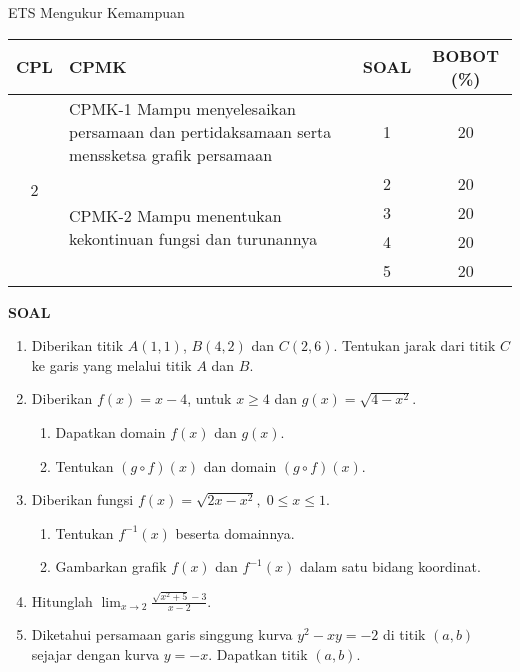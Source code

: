 \documentclass[11pt,openany,a4paper]{article}
\begin{document}
\begin{table}[h]
    \centering
    ETS Mengukur Kemampuan
    \begin{tabular}{|c|m{11cm}|c|c|}
        \hline
        CPL & CPMK                                                                                      & SOAL & BOBOT (\%) \\ \hline
        \multirow{5}{*}{2}
            & CPMK-1 Mampu menyelesaikan persamaan dan pertidaksamaan serta menssketsa grafik persamaan & 1    & 20         \\ \cline{2-4}
            & \multirow{4}{*}{CPMK-2 Mampu menentukan kekontinuan fungsi dan turunannya}                & 2    & 20         \\\cline{3-4}
            &                                                                                           & 3    & 20         \\ \cline{3-4}
            &                                                                                           & 4    & 20         \\ \cline{3-4}
            &                                                                                           & 5    & 20         \\ \hline
    \end{tabular}
\end{table}
{\centering\textbf{SOAL}}
\begin{enumerate}
    \item Diberikan titik $A(1,1)$, $B(4,2)$ dan $C(2,6)$. Tentukan jarak dari titik $C$ ke garis yang melalui titik $A$ dan $B$.

    \item Diberikan $f(x) = x - 4$, untuk $x \geq 4$ dan $g(x) = \sqrt{4 - x^2}$.
          \begin{enumerate}
              \item Dapatkan domain $f(x)$ dan $g(x)$.
              \item Tentukan $(g \circ f)(x)$ dan domain $(g \circ f)(x)$.
          \end{enumerate}

    \item Diberikan fungsi $f(x) = \sqrt{2x - x^2}, \; 0 \leq x \leq 1$.
          \begin{enumerate}
              \item Tentukan $f^{-1}(x)$ beserta domainnya.
              \item Gambarkan grafik $f(x)$ dan $f^{-1}(x)$ dalam satu bidang koordinat.
          \end{enumerate}

    \item Hitunglah
          $\displaystyle
              \lim_{x \to 2} \frac{\sqrt{x^2 + 5} - 3}{x - 2}.
          $

    \item Diketahui persamaan garis singgung kurva $y^2 - xy = -2$ di titik $(a,b)$ sejajar dengan kurva $y = -x$.
          Dapatkan titik $(a,b)$.

\end{enumerate}
\end{document}
